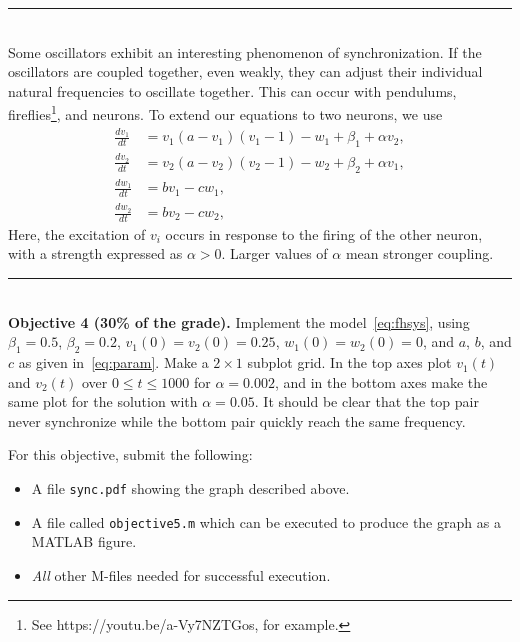 \documentclass[11pt,letterpaper]{article}
\begin{document}
\hfill \rule{4in}{1pt} \hspace*{\fill}\\

Some oscillators exhibit an interesting phenomenon of synchronization. If the oscillators are coupled together, even weakly, they can adjust their individual natural frequencies to oscillate together. This can occur with pendulums, fireflies\footnote{See
  https://youtu.be/a-Vy7NZTGos, for example.}, and neurons. To extend
our equations to two neurons, we use
\begin{equation}
  \label{eq:fhsys}
  \begin{split}
    \frac{dv_1}{dt} &= v_1(a-v_1)(v_1-1) - w_1 + \beta_1 + \alpha v_2,\\
    \frac{dv_2}{dt} &= v_2(a-v_2)(v_2-1) - w_2 + \beta_2 + \alpha v_1,\\
    \frac{dw_1}{dt} &= b v_1 - c w_1,\\
    \frac{dw_2}{dt} &= b v_2 - c w_2,
  \end{split}
\end{equation}
Here, the excitation of $v_i$ occurs in response to the 
firing of the other neuron, with a strength expressed as $\alpha >
0$. Larger values of $\alpha$ mean stronger coupling.


\hfill \rule{4in}{1pt} \hspace*{\fill}\\

\noindent \textbf{Objective 4 (30\% of the grade).} Implement the model~\eqref{eq:fhsys}, using $\beta_1=0.5$, $\beta_2=0.2$, $v_1(0)=v_2(0)=0.25$, $w_1(0)=w_2(0)=0$, and $a$, $b$, and $c$ as given in~\eqref{eq:param}. Make a $2\times 1$ subplot grid. In the top axes plot $v_1(t)$ and $v_2(t)$ over $0\le t \le 1000$ for $\alpha = 0.002$, and in the bottom axes make the same plot for the solution with $\alpha=0.05$. It should be clear that the top pair never synchronize while the bottom pair quickly reach the same frequency.

For this objective, submit the following:
\begin{itemize}
\item A file \texttt{sync.pdf} showing the graph described above.
\item A file called \texttt{objective5.m} which can be executed to
  produce the graph as a MATLAB figure.
\item \textit{All} other M-files needed for successful execution.
\end{itemize}
\end{document}
